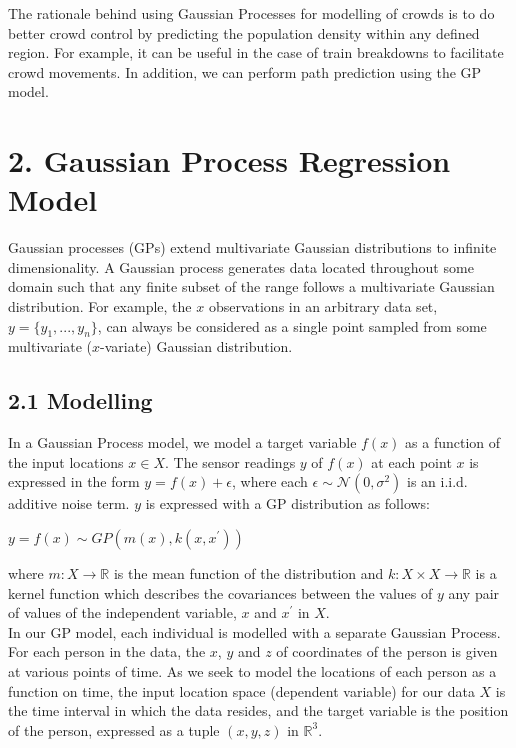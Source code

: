 \documentclass[letterpaper]{article}
\begin{document}
The rationale behind using Gaussian Processes for modelling of crowds is to do better crowd control by predicting the population density within any defined region. For example, it can be useful in the case of train breakdowns to facilitate crowd movements. In addition, we can perform path prediction using the GP model.

\section{2.  Gaussian Process Regression Model}

Gaussian processes (GPs) extend multivariate Gaussian distributions to infinite dimensionality. A Gaussian process generates data located throughout some domain such that any finite subset of the range follows a multivariate Gaussian distribution. For example, the $x$ observations in an arbitrary data set, $y = \{y_1,...,y_n\}$, can always be considered as a single point sampled from some multivariate ($x$-variate) Gaussian distribution. 

\subsection{2.1  Modelling}

In a Gaussian Process model, we model a target variable $f(x)$ as a function of the input locations $x \in X$. The sensor readings $y$ of $f(x)$ at each point $x$ is expressed in the form $y = f(x) + \epsilon$, where each $\epsilon \sim \mathcal{N}(0, \sigma^2)$ is an i.i.d. additive noise term. $y$ is expressed with a GP distribution as follows:

\begin{center}
$y = f(x) \sim GP(m(x), k(x,x^\prime))$
\end{center}

where $m: X \rightarrow \mathbb{R}$ is the mean function of the distribution and $k: X \times X \rightarrow \mathbb{R}$ is a kernel function which describes the covariances between the values of $y$ any pair of values of the independent variable, $x$ and $x^\prime$ in $X$. \\

In our GP model, each individual is modelled with a separate Gaussian Process. For each person in the data, the $x$, $y$ and $z$ of coordinates of the person is given at various points of time. As we seek to model the locations of each person as a function on time, the input location space (dependent variable) for our data $X$ is the time interval in which the data resides, and the target variable is the position of the person, expressed as a tuple $(x,y,z)$ in $\mathbb{R}^3$.
\end{document}
